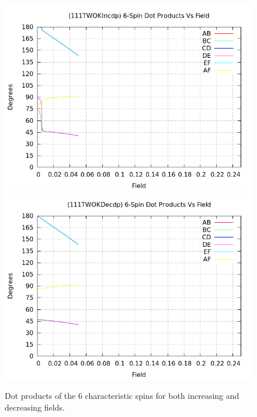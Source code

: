 \documentclass{article}
\begin{document}
\begin{figure}[ht]
\centering
\includegraphics[scale=0.5]{HVariedData/Pictures/111TWOKIncdp.png}
\includegraphics[scale=0.5]{HVariedData/Pictures/111TWOKDecdp.png}
\caption{Dot products of the 6 characteristic spins for both increasing and decreasing fields.}
\end{figure}

\clearpage
\end{document}
